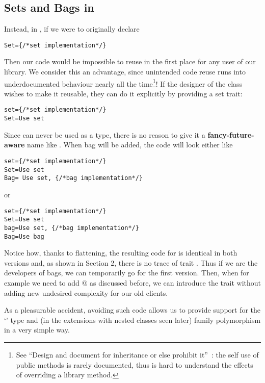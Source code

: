 \subsection{Sets and Bags in \name}
Instead, in \name, if we were to originally declare
\saveSpace\begin{lstlisting}
Set={/*set implementation*/} 
\end{lstlisting}\saveSpace
Then our code would be impossible to reuse in the first place for any user of our library.
We consider this an advantage, since unintended code reuse runs into underdocumented behaviour nearly all the time\footnote{See
``Design and document for inheritance or else prohibit
it''~\cite{Bloch08}: the
self use of public methods is rarely documented, thus is hard to understand the effects of overriding a library method.
}!
If the designer of the \Q@Set@ class wishes to make it reusable, they can do it explicitly by providing a set trait:
\saveSpace\begin{lstlisting}
set={/*set implementation*/} 
Set=Use set
\end{lstlisting}\saveSpace
Since \Q@set@ can never be used as a type, there is no reason to give it a {\bf fancy-future-aware} name like
\Q@AbstractSetOrBag@.
When bag will be added, the code will look either like
\saveSpace\begin{lstlisting}
set={/*set implementation*/} 
Set=Use set
Bag= Use set, {/*bag implementation*/}
\end{lstlisting}\saveSpace\saveSpace
or 
\saveSpace\saveSpace\begin{lstlisting}
set={/*set implementation*/} 
Set=Use set
bag=Use set, {/*bag implementation*/}
Bag=Use bag
\end{lstlisting}\saveSpace
Notice how, thanks to flattening, the resulting code for \Q@Bag@ is identical in both versions
and, as shown in Section 2, there is no trace of trait \Q@bag@. 
Thus if we are the developers of bags, we can temporarily go for the first version.
Then, when for example we need to add @ as discussed before,
we can introduce the \Q@bag@ trait without adding new undesired complexity for our old clients.


As a pleasurable accident, avoiding such code allows us to provide support for the
`\Q@This@' type and (in the extensions with nested classes seen later)
family polymorphism in a very simple way.

